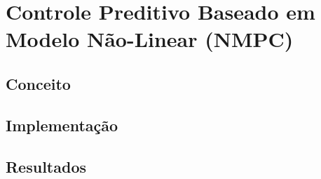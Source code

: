 \section{Controle Preditivo Baseado em Modelo Não-Linear (NMPC)}
\subsection{Conceito}


\subsection{Implementação}


\subsection{Resultados}